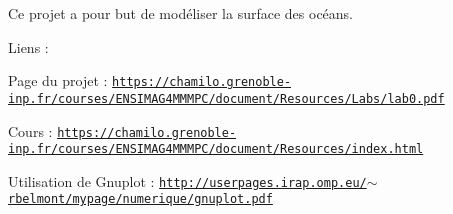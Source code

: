 Ce projet a pour but de modéliser la surface des océans.

Liens \+:
\begin{DoxyItemize}
\item Page du projet \+: \href{https://chamilo.grenoble-inp.fr/courses/ENSIMAG4MMMPC/document/Resources/Labs/lab0.pdf}{\tt https\+://chamilo.\+grenoble-\/inp.\+fr/courses/\+E\+N\+S\+I\+M\+A\+G4\+M\+M\+M\+P\+C/document/\+Resources/\+Labs/lab0.\+pdf}
\item Cours \+: \href{https://chamilo.grenoble-inp.fr/courses/ENSIMAG4MMMPC/document/Resources/index.html}{\tt https\+://chamilo.\+grenoble-\/inp.\+fr/courses/\+E\+N\+S\+I\+M\+A\+G4\+M\+M\+M\+P\+C/document/\+Resources/index.\+html}
\item Utilisation de Gnuplot \+: \href{http://userpages.irap.omp.eu/~rbelmont/mypage/numerique/gnuplot.pdf}{\tt http\+://userpages.\+irap.\+omp.\+eu/$\sim$rbelmont/mypage/numerique/gnuplot.\+pdf} 
\end{DoxyItemize}
